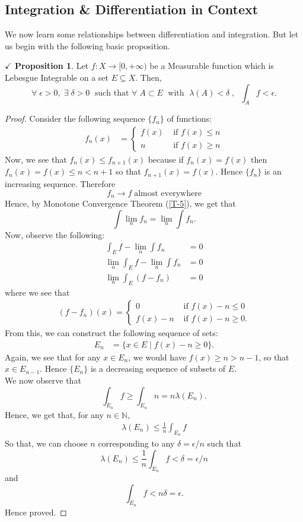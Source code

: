 \documentclass{article}
\theoremstyle{definition}
\theoremstyle{remark}
\theoremstyle{definition}
\theoremstyle{definition}
\newtheorem{proposition}{$\checkmark$ Proposition}
\theoremstyle{definition}
\newcommand{\where}{\;\vert\;}
\newcommand{\N}{\mathbb{N}}
\newcommand{\lm}[1]{\lambda\left (#1\right )}
\begin{document}
\subsection{Integration \& Differentiation in Context}
We now learn some relationships between differentiation and integration. But let us begin with the following basic proposition.
\begin{proposition}\label{P-48}
	Let $ f : X \to [0,+\infty) $ be a Measurable function which is Lebesgue Integrable on a set $ E \subseteq X $. Then,
	\[\forall \;\epsilon > 0, \;\exists\; \delta > 0 \;\text{ such that } \forall \; A\subset E\;\text{ with }\;\lm{A} < \delta \;,\;\;\int_{A} f < \epsilon.\]
\end{proposition}
\begin{proof}
	Consider the following sequence $ \{f_n\} $ of functions:
	\begin{align*}
		f_n(x) &= \begin{cases}
			f(x) &\text{ if } f(x)\le n\\
			n &\text{ if }f(x)\ge n
		\end{cases}
	\end{align*}
Now, we see that $ f_n(x) \le f_{n+1}(x) $ because if $ f_n(x) = f(x) $ then $ f_n(x) = f(x) \le n < n+1 $ so that $ f_{n+1}(x) = f(x) $. Hence $ \{f_n\} $ is an increasing sequence. Therefore 
\[f_n \longrightarrow f \;\text{almost everywhere}\]
Hence, by Monotone Convergence Theorem (\ref{T-5}), we get that 
\[\int \lim_{n}f_n = \lim_{n} \int f_n.\]
Now, observe the following:
\begin{align*}
	\int_{E} f- \lim_{n} \int f_n &= 0\\
	\lim_{n}\int_E f - \lim_{n}\int f_n &= 0\\
	\lim_{n} \int_E \left ( f -f_n\right ) &= 0
\end{align*}
where we see that
\begin{align*}
	(f-f_n)(x)= \begin{cases}
		0&\text{ if } f(x) - n\le 0\\
		f(x) -n&\text{ if }f(x) - n\ge 0.
	\end{cases}
\end{align*}
From this, we can construct the following sequence of sets:
\begin{align*}
	E_n &= \{x\in E\where f(x) - n \ge 0\}.
\end{align*}
Again, we see that for any $ x\in E_n $, we would have $ f(x) \ge n > n-1$, so that $ x\in E_{n-1} $. Hence $ \{E_n\} $ is a decreasing sequence of subsets of $ E $.\\
We now observe that 
\[\int_{E_n} f \ge \int_{E_n} n = n\lm{E_n}.\]
Hence, we get that, for any $ n\in \N $,
\begin{align*}
	\lm{E_n} \le \frac{1}{n}\int_{E_n} f
\end{align*}
So that, we can choose $ n $ corresponding to any $ \delta = \epsilon/n $ such that 
\[\lm{E_n} \le \frac{1}{n}\int_{E_n} f < \delta  = \epsilon/n\] 
and
\[\int_{E_n} f < n\delta = \epsilon.\]
Hence proved.
\end{proof}
\hrulefill
\newpage
\end{document}
